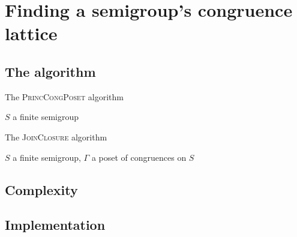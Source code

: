 \chapter{Finding a semigroup's congruence lattice}
\label{chap:lattice}

\lipsum[3]

\section{The algorithm}

\begin{algorithm}
\caption{The \textsc{PrincCongPoset} algorithm}
\label{alg:princ-cong-poset}
\begin{algorithmic}[1]
    \Require $S$ a finite semigroup
    \EndProcedure
\end{algorithmic}
\end{algorithm}

\begin{algorithm}
\caption{The \textsc{JoinClosure} algorithm}
\label{alg:join-closure}
\begin{algorithmic}[1]
    \Require $S$ a finite semigroup, $\Gamma$ a poset of congruences on $S$
    \EndProcedure
\end{algorithmic}
\end{algorithm}

\section{Complexity}

\section{Implementation}
